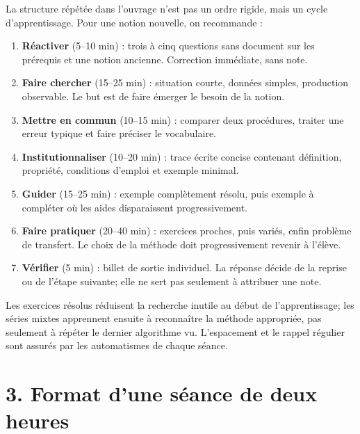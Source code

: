 La structure répétée dans l'ouvrage n'est pas un ordre rigide, mais un cycle
d'apprentissage. Pour une notion nouvelle, on recommande :

\begin{enumerate}
  \item \textbf{Réactiver} (5--10 min) : trois à cinq questions sans document sur
  les prérequis et une notion ancienne. Correction immédiate, sans note.
  \item \textbf{Faire chercher} (15--25 min) : situation courte, données simples,
  production observable. Le but est de faire émerger le besoin de la notion.
  \item \textbf{Mettre en commun} (10--15 min) : comparer deux procédures, traiter
  une erreur typique et faire préciser le vocabulaire.
  \item \textbf{Institutionnaliser} (10--20 min) : trace écrite concise contenant
  définition, propriété, conditions d'emploi et exemple minimal.
  \item \textbf{Guider} (15--25 min) : exemple complètement résolu, puis exemple à
  compléter où les aides disparaissent progressivement.
  \item \textbf{Faire pratiquer} (20--40 min) : exercices proches, puis variés,
  enfin problème de transfert. Le choix de la méthode doit progressivement
  revenir à l'élève.
  \item \textbf{Vérifier} (5 min) : billet de sortie individuel. La réponse décide
  de la reprise ou de l'étape suivante; elle ne sert pas seulement à attribuer
  une note.
\end{enumerate}

Les exercices résolus réduisent la recherche inutile au début de
l'apprentissage; les séries mixtes apprennent ensuite à reconnaître la méthode
appropriée, pas seulement à répéter le dernier algorithme vu. L'espacement et le
rappel régulier sont assurés par les automatismes de chaque séance.

\section*{3. Format d'une séance de deux heures}

